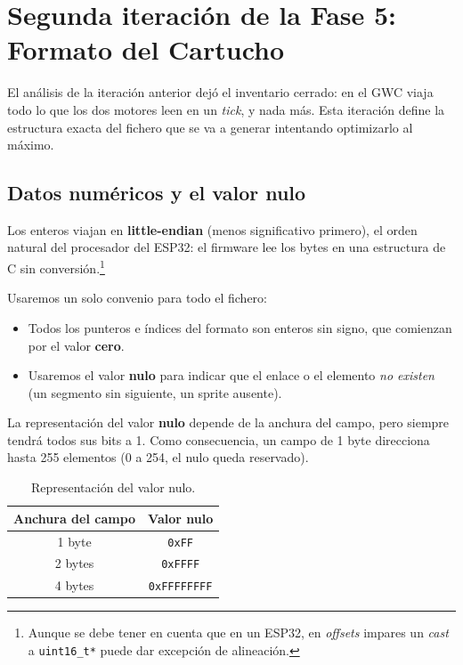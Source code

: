 \section{Segunda iteración de la Fase 5: Formato del Cartucho}
\label{sec:F5I2}

El análisis de la iteración anterior dejó el inventario cerrado: en
el GWC viaja todo lo que los dos motores leen en un \textit{tick}, y
nada más. Esta iteración define la estructura exacta del
fichero que se va a generar intentando optimizarlo al máximo.

\subsection{Datos numéricos y el valor nulo}
\label{sec:F5I2Nulo}

Los enteros viajan en \textbf{little-endian} (menos significativo
primero), el orden natural del procesador del ESP32: el firmware lee
los bytes en una estructura de C sin conversión.\footnote{Aunque se debe tener en cuenta que en un ESP32, en \textit{offsets} impares un \textit{cast} a \texttt{uint16\_t*} puede dar excepción de alineación.}

Usaremos un solo convenio para todo el fichero:

\begin{itemize}
	\item Todos los punteros e índices del formato son enteros sin signo, que comienzan
	por el valor \textbf{cero}.
	
	\item Usaremos el valor \textbf{nulo} para indicar que el enlace o el elemento
	\emph{no existen} (un segmento sin siguiente, un sprite ausente).
\end{itemize}

La representación del valor \textbf{nulo} depende de la anchura del campo, pero siempre tendrá todos sus bits a 1. Como consecuencia, un campo de 1 byte direcciona hasta 255 elementos (0 a 254, el nulo queda reservado).

\begin{table}[H]
	\centering
	\begin{tabular}{|c|c|}
		\hline
		\textbf{Anchura del campo} & \textbf{Valor nulo} \\
		\hline
		1 byte  & \texttt{0xFF} \\ \hline
		2 bytes & \texttt{0xFFFF} \\ \hline
		4 bytes & \texttt{0xFFFFFFFF} \\ \hline
	\end{tabular}
	\caption{Representación del valor nulo.}
\end{table}

